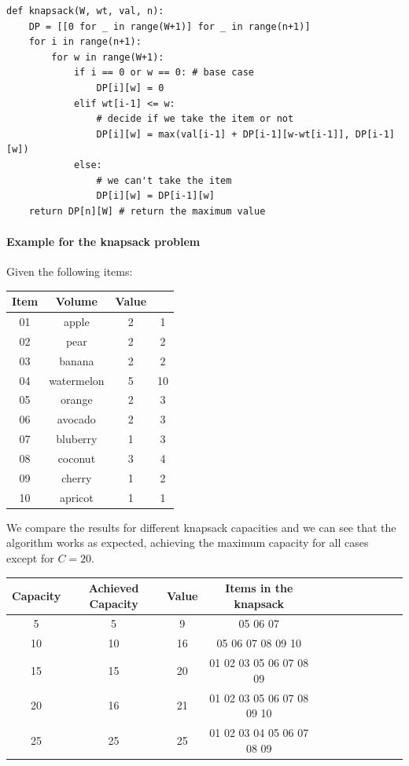 \begin{lstlisting}
def knapsack(W, wt, val, n):
    DP = [[0 for _ in range(W+1)] for _ in range(n+1)]
    for i in range(n+1):
        for w in range(W+1):
            if i == 0 or w == 0: # base case
                DP[i][w] = 0
            elif wt[i-1] <= w:
                # decide if we take the item or not
                DP[i][w] = max(val[i-1] + DP[i-1][w-wt[i-1]], DP[i-1][w])
            else:
                # we can't take the item
                DP[i][w] = DP[i-1][w]
    return DP[n][W] # return the maximum value
\end{lstlisting}

\paragraph*{Example for the knapsack problem}
Given the following items:
\begin{table}[H]
    \centering
    \begin{tabular}{c|c|c|c|}
        Item & Volume     & Value      \\ \hline
        01   & apple      & 2     & 1  \\
        02   & pear       & 2     & 2  \\
        03   & banana     & 2     & 2  \\
        04   & watermelon & 5     & 10 \\
        05   & orange     & 2     & 3  \\
        06   & avocado    & 2     & 3  \\
        07   & bluberry   & 1     & 3  \\
        08   & coconut    & 3     & 4  \\
        09   & cherry     & 1     & 2  \\
        10   & apricot    & 1     & 1  \\
        \hline
    \end{tabular}
\end{table}

We compare the results for different knapsack capacities and we can see that the algorithm works as expected, achieving the maximum capacity for all cases except for $C=20$.
\begin{table}[H]
    \centering
    \begin{tabular}{c|c|c|c|c|c|c|c|c|c|c|c|}
        Capacity & Achieved Capacity & Value & Items in the knapsack      \\ \hline
        5        & 5                 & 9     & 05 06 07                   \\
        10       & 10                & 16    & 05 06 07 08 09 10          \\
        15       & 15                & 20    & 01 02 03 05 06 07 08 09    \\
        20       & 16                & 21    & 01 02 03 05 06 07 08 09 10 \\
        25       & 25                & 25    & 01 02 03 04 05 06 07 08 09 \\
    \end{tabular}
\end{table}